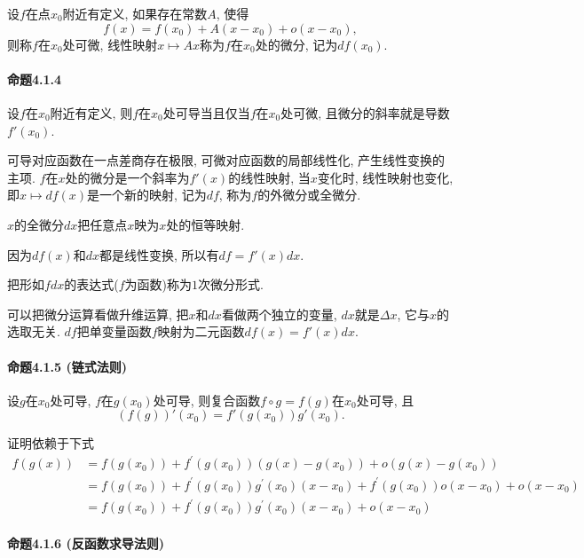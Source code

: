 设$f$在点$x_{0}$附近有定义, 如果存在常数$A$, 使得
\[
f(x)=f(x_{0})+A(x-x_{0})+o(x-x_{0}),
\]
则称$f$在$x_{0}$处可微, 线性映射$x\mapsto Ax$称为$f$在$x_{0}$处的微分, 记为$df(x_{0})$.

\paragraph{命题4.1.4}

设$f$在$x_{0}$附近有定义, 则$f$在$x_{0}$处可导当且仅当$f$在$x_{0}$处可微, 且微分的斜率就是导数$f'(x_{0})$.

可导对应函数在一点差商存在极限, 可微对应函数的局部线性化, 产生线性变换的主项. $f$在$x$处的微分是一个斜率为$f'(x)$的线性映射,
当$x$变化时, 线性映射也变化, 即$x\mapsto df(x)$是一个新的映射, 记为$df$, 称为$f$的外微分或全微分. 

$x$的全微分$dx$把任意点$x$映为$x$处的恒等映射. 

因为$df(x)$和$dx$都是线性变换, 所以有$df=f'(x)dx$.

把形如$fdx$的表达式($f$为函数)称为$1$次微分形式.

可以把微分运算看做升维运算, 把$x$和$dx$看做两个独立的变量, $dx$就是$\Delta x$, 它与$x$的选取无关.
$df$把单变量函数$f$映射为二元函数$df(x)=f'(x)dx$.

\paragraph{命题4.1.5 (链式法则)}

设$g$在$x_{0}$处可导, $f$在$g(x_{0})$处可导, 则复合函数$f\circ g=f(g)$在$x_{0}$处可导,
且
\[
\left(f(g)\right)'(x_{0})=f'\left(g(x_{0})\right)g'(x_{0}).
\]

证明依赖于下式
\[
\begin{aligned}f(g(x)) & =f\left(g\left(x_{0}\right)\right)+f^{\prime}\left(g\left(x_{0}\right)\right)\left(g(x)-g\left(x_{0}\right)\right)+o\left(g(x)-g\left(x_{0}\right)\right)\\
	& =f\left(g\left(x_{0}\right)\right)+f^{\prime}\left(g\left(x_{0}\right)\right)g^{\prime}\left(x_{0}\right)\left(x-x_{0}\right)+f^{\prime}\left(g\left(x_{0}\right)\right)o\left(x-x_{0}\right)+o\left(x-x_{0}\right)\\
	& =f\left(g\left(x_{0}\right)\right)+f^{\prime}\left(g\left(x_{0}\right)\right)g^{\prime}\left(x_{0}\right)\left(x-x_{0}\right)+o\left(x-x_{0}\right)
\end{aligned}
\]


\paragraph{命题4.1.6 (反函数求导法则)}

